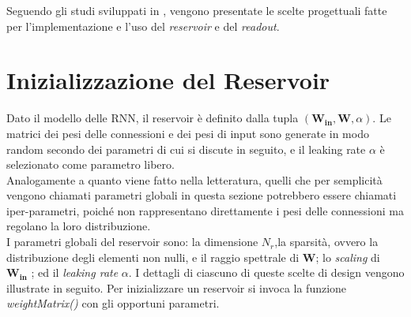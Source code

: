 Seguendo gli studi sviluppati in \cite{praticalguide}, vengono presentate le scelte progettuali fatte per l'implementazione e l'uso del \textit{reservoir} e del \textit{readout}.
\section{Inizializzazione del Reservoir}
Dato il modello delle RNN, il reservoir è definito dalla tupla $(\mathbf{W_{in}},\mathbf{W}, \alpha)$. Le matrici dei pesi delle connessioni e dei pesi di input sono generate in modo random secondo dei parametri di cui si discute in seguito, e il leaking rate $\alpha$ è selezionato come parametro libero.\\
Analogamente a quanto viene fatto nella letteratura, quelli che per semplicità vengono chiamati parametri globali in questa sezione potrebbero essere chiamati iper-parametri, poiché non rappresentano direttamente i pesi delle connessioni ma regolano la loro distribuzione.\\
I parametri globali del reservoir sono: la dimensione $N_r$,la sparsità, ovvero la distribuzione degli elementi non nulli, e il raggio spettrale di $\mathbf{W}$; lo \textit{scaling} di $\mathbf{W_{in}}$ ; ed il \textit{leaking rate} $\alpha$.
I dettagli di ciascuno di queste scelte di design vengono illustrate in seguito.
Per inizializzare un reservoir si  invoca la funzione \textit{weightMatrix()} con gli opportuni parametri.\\
\\


